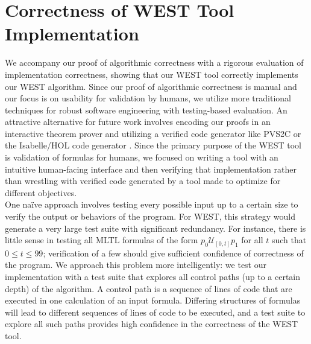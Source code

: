 \documentclass[runningheads]{llncs}
\begin{document}
\section{Correctness of WEST Tool Implementation} \label{test}
We accompany our proof of algorithmic correctness with a rigorous evaluation of implementation correctness, showing that our WEST tool correctly implements our WEST algorithm. Since our proof of algorithmic correctness is manual and our focus is on usability for validation by humans, we utilize more traditional techniques for robust software engineering with testing-based evaluation. An attractive alternative for future work involves encoding our proofs in an interactive theorem prover and utilizing a verified code generator like PVS2C\cite{Sha17} or the Isabelle/HOL code generator \cite{HB21}. 
Since the primary purpose of the WEST tool is validation of formulas for humans, we focused on writing a tool with an intuitive human-facing interface and then verifying that implementation rather than wrestling with verified code generated by a tool made to optimize for different objectives.\\
One na\"ive approach involves testing every possible input up to a certain size to verify the output or behaviors of the program.
For WEST, this strategy would generate a very large test suite with significant redundancy. 
For instance, there is little sense in testing all MLTL formulas of the form $p_0 \mathcal{U}_{[0,t]} p_1$ for all $t$ such that $0 \leq t \leq 99$; verification of a few should give sufficient confidence of correctness of the program. 
We approach this problem more intelligently: we test our implementation with a test suite that explores all control paths (up to a certain depth) of the algorithm. A control path is a sequence of lines of code that are executed in one calculation of an input formula. Differing structures of formulas will lead to different sequences of lines of code to be executed, and a test suite to explore all such paths provides high confidence in the correctness of the WEST tool.
\end{document}
